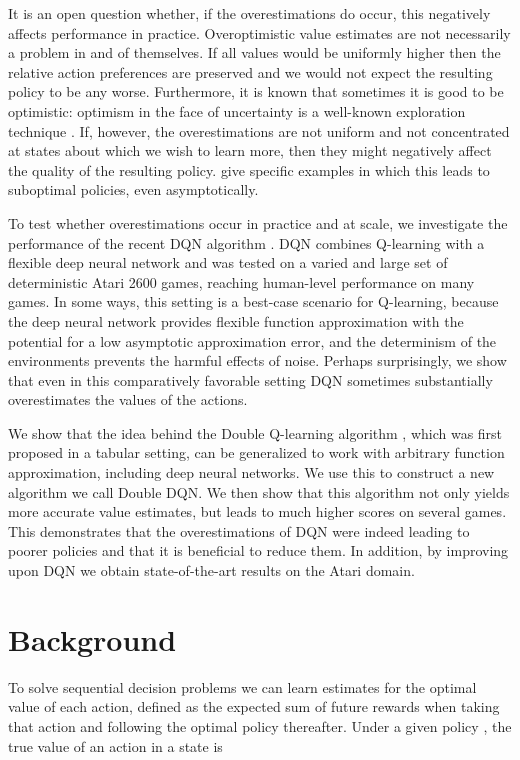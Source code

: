 \documentclass[letterpaper]{article}
\begin{document}
It is an open question whether, if the overestimations do occur, this negatively affects performance in practice. Overoptimistic value estimates are not necessarily a problem in and of themselves.  If all values would be uniformly higher then the relative action preferences are preserved and we would not expect the resulting policy to be any worse.  Furthermore, it is known that sometimes it is good to be optimistic: optimism in the face of uncertainty is a well-known exploration technique \citep{Kaelbling:1996}.  If, however, the overestimations are not uniform and not concentrated at states about which we wish to learn more, then they might negatively affect the quality of the resulting policy.  \citet{Thrun:1993} give specific examples in which this leads to suboptimal policies, even asymptotically.

To test whether overestimations occur in practice and at scale, we investigate the performance of the recent DQN algorithm \citep{Mnih:2015}.  DQN combines Q-learning with a flexible deep neural network and was tested on a varied and large set of deterministic Atari 2600 games, reaching human-level performance on many games.  In some ways, this setting is a best-case scenario for Q-learning, because the deep neural network provides flexible function approximation with the potential for a low asymptotic approximation error, and the determinism of the environments prevents the harmful effects of noise.
Perhaps surprisingly, we show that even in this comparatively favorable setting DQN sometimes substantially overestimates the values of the actions.

We show that the idea behind the Double Q-learning algorithm \citep{vanHasselt:2010}, which was first proposed in a tabular setting, can be generalized to work with arbitrary function approximation, including deep neural networks.  We use this to construct a new algorithm we call Double DQN.  We then show that this algorithm not only yields more accurate value estimates, but leads to much higher scores on several games.  This demonstrates that the overestimations of DQN were indeed leading to poorer policies and that it is beneficial to reduce them.  In addition, by improving upon DQN we obtain state-of-the-art results on the Atari domain.


\section{Background}
\label{sec:qoveropt}


To solve sequential decision problems we can learn estimates for the optimal value of each action, defined as the expected sum of future rewards
when taking that action and following the optimal policy thereafter.  Under a given policy , the true value of an action  in a state  is
\end{document}
